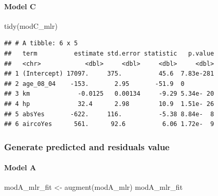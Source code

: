 \documentclass[
]{article}
\newenvironment{Shaded}{\begin{snugshade}}{\end{snugshade}}
\newcommand{\FunctionTok}[1]{\textcolor[rgb]{0.00,0.00,0.00}{#1}}
\newcommand{\NormalTok}[1]{#1}
\newcommand{\OtherTok}[1]{\textcolor[rgb]{0.56,0.35,0.01}{#1}}
\begin{document}
\hypertarget{model-c-8}{%
\paragraph{Model C}\label{model-c-8}}

\begin{Shaded}
\begin{Highlighting}[]
\FunctionTok{tidy}\NormalTok{(modC\_mlr)}
\end{Highlighting}
\end{Shaded}

\begin{verbatim}
## # A tibble: 6 x 5
##   term          estimate std.error statistic   p.value
##   <chr>            <dbl>     <dbl>     <dbl>     <dbl>
## 1 (Intercept) 17097.     375.          45.6  7.83e-281
## 2 age_08_04    -153.       2.95       -51.9  0        
## 3 km             -0.0125   0.00134     -9.29 5.34e- 20
## 4 hp             32.4      2.98        10.9  1.51e- 26
## 5 absYes       -622.     116.          -5.38 8.84e-  8
## 6 aircoYes      561.      92.6          6.06 1.72e-  9
\end{verbatim}

\hypertarget{generate-predicted-and-residuals-value}{%
\subsubsection{Generate predicted and residuals
value}\label{generate-predicted-and-residuals-value}}

\hypertarget{model-a-10}{%
\paragraph{Model A}\label{model-a-10}}

\begin{Shaded}
\begin{Highlighting}[]
\NormalTok{modA\_mlr\_fit }\OtherTok{\textless{}{-}} \FunctionTok{augment}\NormalTok{(modA\_mlr)}
\NormalTok{modA\_mlr\_fit}
\end{Highlighting}
\end{Shaded}
\end{document}
